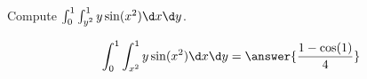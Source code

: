 \documentclass{ximera}
\author{David Guichard \and Neal Koblitz \and H. Jerome Keisler \and Albert Scheller \and Barry Balof \and Mike Wills \and Matthew Carr}
\begin{document}
\begin{exercise}




Compute $\int_{0}^{1}\int_{y^2}^{1}y\sin(x^2)\d x\d y$.
\begin{prompt}
\[
\int_{0}^{1}\int_{x^2}^{1}y\sin(x^2)\d x\d y=\answer{\frac{1-\cos(1)}{4}}
\]
\end{prompt}



\end{exercise}
\end{document}
